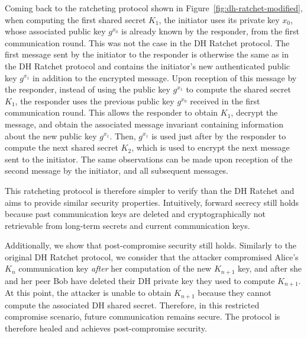 Coming back to the ratcheting protocol shown in Figure~\ref{fig:dh-ratchet-modified}, when computing the first shared secret $K_1$, the initiator uses its private key $x_0$, whose associated public key $g^{x_0}$ is already known by the responder, from the first communication round.
This was not the case in the DH Ratchet protocol.
The first message sent by the initiator to the responder is otherwise the same as in the DH Ratchet protocol and contains the initiator's new authenticated public key $g^{x_1}$ in addition to the encrypted message.
Upon reception of this message by the responder, instead of using the public key $g^{x_1}$ to compute the shared secret $K_1$, the responder uses the previous public key $g^{x_0}$ received in the first communication round.
This allows the responder to obtain $K_1$, decrypt the message, and obtain the associated message invariant containing information about the new public key $g^{x_1}$.
Then, $g^{x_1}$ is used just after by the responder to compute the next shared secret $K_2$, which is used to encrypt the next message sent to the initiator.
The same observations can be made upon reception of the second message by the initiator, and all subsequent messages. 

This ratcheting protocol is therefore simpler to verify than the DH Ratchet and aims to provide similar security properties.
Intuitively, forward secrecy still holds because past communication keys are deleted and cryptographically not retrievable from long-term secrets and current communication keys.

Additionally, we show that post-compromise security still holds.
Similarly to the original DH Ratchet protocol, we consider that the attacker compromised Alice's $K_n$ communication key \emph{after} her computation of the new $K_{n+1}$ key, and after she and her peer Bob have deleted their DH private key they used to compute $K_{n+1}$.
At this point, the attacker is unable to obtain $K_{n+1}$ because they cannot compute the associated DH shared secret.
Therefore, in this restricted compromise scenario, future communication remains secure.
The protocol is therefore healed and achieves post-compromise security.

